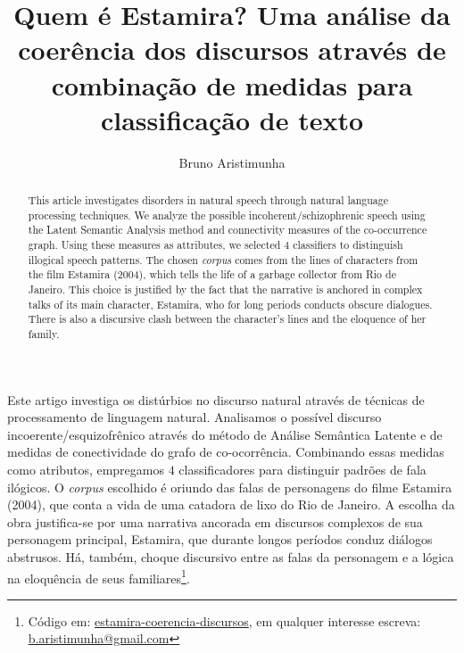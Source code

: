 \documentclass[11pt]{article}
\title{Quem é Estamira? Uma análise da coerência dos discursos através de combinação de medidas para classificação de texto}{\vspace{-10cm}}
\author{Bruno Aristimunha\inst{1}}
\begin{document}
 

\maketitle
\begin{abstract}
This article investigates disorders in natural speech through natural language processing techniques. We analyze the possible incoherent/schizophrenic speech using the Latent Semantic Analysis method and connectivity measures of the co-occurrence graph. Using these measures as attributes, we selected $4$ classifiers to distinguish illogical speech patterns. The chosen \textit{corpus} comes from the lines of characters from the film Estamira (2004), which tells the life of a garbage collector from Rio de Janeiro. This choice is justified by the fact that the narrative is anchored in complex talks of its main character, Estamira, who for long periods conducts obscure dialogues. There is also a discursive clash between the character's lines and the eloquence of her family.
\end{abstract}

\begin{resumo} 
Este artigo investiga os distúrbios no discurso natural através de técnicas de processamento de linguagem natural.  Analisamos o possível discurso incoerente/esquizofrênico através do método de Análise Semântica Latente e de medidas de conectividade do grafo de co-ocorrência. Combinando essas medidas como atributos, empregamos $4$ classificadores para distinguir padrões de fala ilógicos. O \textit{corpus} escolhido é oriundo das falas de personagens do filme Estamira (2004), que conta a vida de uma catadora de lixo do Rio de Janeiro. A escolha da obra justifica-se por uma narrativa ancorada em discursos complexos de sua personagem principal, Estamira, que durante longos períodos conduz diálogos abstrusos. Há, também, choque discursivo entre as falas da personagem e a lógica na eloquência de seus familiares\footnote{Código em: \href{https://github.com/bruAristimunha/estamira-coerencia-discursos}{estamira-coerencia-discursos}, em qualquer interesse escreva: \href{mailto:b.aristimunha@gmail.com}{b.aristimunha@gmail.com} }.
\end{resumo}

\end{document}
